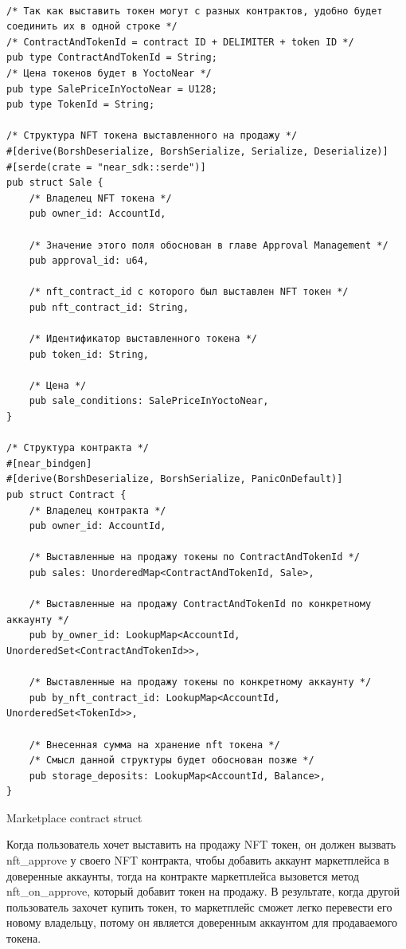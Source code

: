 \begin{listing}
\begin{verbatim}

/* Так как выставить токен могут с разных контрактов, удобно будет соединить их в одной строке */
/* ContractAndTokenId = contract ID + DELIMITER + token ID */
pub type ContractAndTokenId = String;
/* Цена токенов будет в YoctoNear */
pub type SalePriceInYoctoNear = U128;
pub type TokenId = String;

/* Структура NFT токена выставленного на продажу */
#[derive(BorshDeserialize, BorshSerialize, Serialize, Deserialize)]
#[serde(crate = "near_sdk::serde")]
pub struct Sale {
    /* Владелец NFT токена */
    pub owner_id: AccountId,

    /* Значение этого поля обоснован в главе Approval Management */
    pub approval_id: u64,

    /* nft_contract_id с которого был выставлен NFT токен */
    pub nft_contract_id: String,

    /* Идентификатор выставленного токена */
    pub token_id: String,

    /* Цена */
    pub sale_conditions: SalePriceInYoctoNear,
}

/* Структура контракта */
#[near_bindgen]
#[derive(BorshDeserialize, BorshSerialize, PanicOnDefault)]
pub struct Contract {
    /* Владелец контракта */
    pub owner_id: AccountId,

    /* Выставленные на продажу токены по ContractAndTokenId */
    pub sales: UnorderedMap<ContractAndTokenId, Sale>,

    /* Выставленные на продажу ContractAndTokenId по конкретному аккаунту */
    pub by_owner_id: LookupMap<AccountId, UnorderedSet<ContractAndTokenId>>,

    /* Выставленные на продажу токены по конкретному аккаунту */
    pub by_nft_contract_id: LookupMap<AccountId, UnorderedSet<TokenId>>,

    /* Внесенная сумма на хранение nft токена */
    /* Смысл данной структуры будет обоснован позже */
    pub storage_deposits: LookupMap<AccountId, Balance>,
}
\end{verbatim}
\caption{Marketplace contract struct}
\label{marketplacecontract.struct}
\end{listing}

Когда пользователь хочет выставить на продажу NFT токен, он должен вызвать nft\_approve у своего NFT контракта, чтобы добавить аккаунт маркетплейса в доверенные аккаунты, тогда на контракте маркетплейса вызовется метод nft\_on\_approve, который добавит токен на продажу.
В результате, когда другой пользователь захочет купить токен, то маркетплейс сможет легко перевести его новому владельцу, потому он является доверенным аккаунтом для продаваемого токена.

